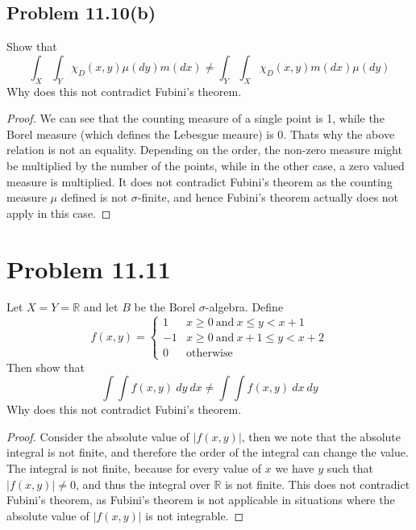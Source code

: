 \documentclass{article}
\def\RR{\mathbb R}
\begin{document}
\subsection*{Problem 11.10(b)} Show that
\[
\int_X \int_Y \chi_D(x,y)\mu(dy)m(dx) \ne \int_Y \int_X \chi_D(x,y)m(dx)\mu(dy)
\]
Why does this not contradict Fubini's theorem.
\begin{proof}
We can see that the counting measure of a single point is 1, while
the Borel measure (which defines the Lebesgue meaure) is 0.
Thats why the above relation is not an equality.
Depending on the order, the non-zero measure might be multiplied
by the number of the points, while in the other case, a zero valued
measure is multiplied.
It does not contradict Fubini's theorem as 
the counting measure $\mu$ defined is not $\sigma$-finite, and hence
Fubini's theorem actually does not apply in this case.
\end{proof}

\section*{Problem 11.11}Let $X=Y=\RR$ and let $B$ be the Borel
$\sigma$-algebra. Define
\[
f(x,y) = \left\{ \begin{array}{cc}
1 & x\ge 0\ \mbox{and}\ x\le y< x+1\\
-1 & x\ge 0\ \mbox{and}\ x+1 \le y < x+2\\
0 & \mbox{otherwise}
\end{array} \right.
\]
Then show that
\[
\int \int f(x,y)\ dy\ dx \ne \int \int f(x,y)\ dx\ dy
\]
Why does this not contradict Fubini's theorem.
\begin{proof}
Consider the absolute value of $|f(x,y)|$, then we note that
the absolute integral is not finite, and therefore the order of
the integral can change the value. 
The integral is not finite, because for every value of $x$ we have
$y$ such that $|f(x,y)|\ne 0$, and thus the integral over $\RR$ is not
finite.
This does not contradict Fubini's
theorem, as Fubini's theorem is not applicable in situations where
the absolute value of $|f(x,y)|$ is not integrable.
\end{proof}
\end{document}
